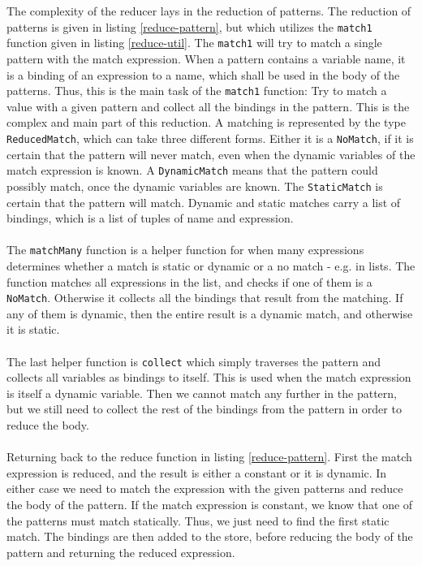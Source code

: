 The complexity of the reducer lays in the reduction of patterns. The reduction of patterns is given in listing \ref{reduce-pattern}, but which utilizes the \texttt{match1} function given in listing \ref{reduce-util}. The \texttt{match1} will try to match a single pattern with the match expression. When a pattern contains a variable name, it is a binding of an expression to a name, which shall be used in the body of the patterns. Thus, this is the main task of the \texttt{match1} function: Try to match a value with a given pattern and collect all the bindings in the pattern. This is the complex and main part of this reduction. A matching is represented by the type \texttt{ReducedMatch}, which can take three different forms. Either it is a \texttt{NoMatch}, if it is certain that the pattern will never match, even when the dynamic variables of the match expression is known. A \texttt{DynamicMatch} means that the pattern could possibly match, once the dynamic variables are known. The \texttt{StaticMatch} is certain that the pattern will match. Dynamic and static matches carry a list of bindings, which is a list of tuples of name and expression. 
\\\\
The \texttt{matchMany} function is a helper function for when many expressions determines whether a match is static or dynamic or a no match - e.g. in lists. The function matches all expressions in the list, and checks if one of them is a \texttt{NoMatch}. Otherwise it collects all the bindings that result from the matching. If any of them is dynamic, then the entire result is a dynamic match, and otherwise it is static. 
\\\\
The last helper function is \texttt{collect} which simply traverses the pattern and collects all variables as bindings to itself. This is used when the match expression is itself a dynamic variable. Then we cannot match any further in the pattern, but we still need to collect the rest of the bindings from the pattern in order to reduce the body.
\\\\
Returning back to the reduce function in listing \ref{reduce-pattern}. First the match expression is reduced, and the result is either a constant or it is dynamic. In either case we need to match the expression with the given patterns and reduce the body of the pattern. If the match expression is constant, we know that one of the patterns must match statically. Thus, we just need to find the first static match. The bindings are then added to the store, before reducing the body of the pattern and returning the reduced expression.

